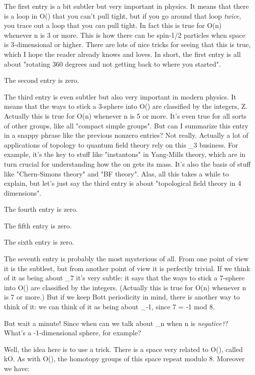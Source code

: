 The first entry is a bit subtler but very important in physics.  It
means that there is a loop in O(\infty ) that you can't pull tight,
but if you go around that loop \emph{twice}, you trace out a loop that you
\emph{can} pull tight.  In fact this is true for O(n) whenever n is 3 or
more.  This is how there can be spin-1/2 particles when space is
3-dimensional or higher.  There are lots of nice tricks for seeing
that this is true, which I hope the reader already knows and loves.
In short, the first entry is all about "rotating 360 degrees and not
getting back to where you started".

The second entry is zero.  

The third entry is even subtler but also very important in modern
physics.  It means that the ways to stick a 3-sphere into O(\infty )
are classified by the integers, Z.  Actually this is true for O(n)
whenever n is 5 or more.  It's even true for all sorts of other
groups, like all "compact simple groups".  But can I summarize this
entry in a snappy phrase like the previous nonzero entries?  Not
really.  Actually a lot of applications of topology to quantum field
theory rely on this \pi _{3} business.  For example, it's the key to stuff
like "instantons" in Yang-Mills theory, which are in turn crucial for
understanding how the \pi on gets its mass.  It's also the basis of
stuff like "Chern-Simons theory" and "BF theory".  Alas, all this
takes a while to explain, but let's just say the third entry is about
"topological field theory in 4 dimensions".

The fourth entry is zero.

The fifth entry is zero.

The sixth entry is zero.

The seventh entry is probably the most mysterious of all.  From one
point of view it is the subtlest, but from another point of view it is
perfectly trivial.   If we think of it as being about \pi _{7} it's very
subtle: it says that the ways to stick a 7-sphere into O(\infty ) are
classified by the integers.   (Actually this is true for O(n) whenever
n is 7 or more.)  But if we keep Bott periodicity in mind, there is
another way to think of it: we can think of it as being about \pi _{-1},
since 7 = -1 mod 8.  

But wait a minute!  Since when can we talk about \pi _{n} when n is
\emph{negative?!}  What's a -1-dimensional sphere, for example?

Well, the idea here is to use a trick.  There is a space very related
to O(\infty ), called kO.   As with O(\infty ), the homotopy
groups of this space repeat modulo 8.  Moreover we have:

